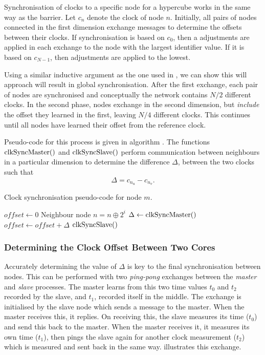 Synchronisation of clocks to a specific node for a hypercube works in the same
way as the barrier. Let $c_n$ denote the clock of node $n$. Initially, all pairs
of nodes connected in the first dimension exchange messages to determine the
offsets between their clocks. If synchronisation is based on $c_0$, then a
adjustments are applied in each exchange to the node with the largest identifier
value. If it is based on $c_{N-1}$, then adjustments are applied to the lowest. 

Using a similar inductive argument as the one used in , we can
show this will approach will result in global synchronisation. After the 
first exchange, each pair of nodes are synchronised and conceptually the network
contains $N/2$ different clocks. In the second phase, nodes exchange in the
second dimension, but \emph{include} the offset they learned in the first,
leaving $N/4$ different clocks. This continues until all nodes have learned their
offset from the reference clock. 

Pseudo-code for this process is given in algorithm .  The
functions $\mathop{\mathrm{clkSyncMaster}()}$ and $\mathop{\mathrm{clkSyncSlave}()}$ perform communication between
neighbours in a particular dimension to determine the difference $\Delta$,
between the two clocks such that $$\Delta = c_{n_u} - c_{n_v}.$$

\begin{algorithm}
\caption{Clock synchronisation pseudo-code for node $m$.}
\label{alg:clksync}

\begin{algorithmic}
\STATE $offset \gets 0$
    \STATE Neighbour node $n = n \oplus 2^i$
        \STATE $\Delta \gets \mathop{\mathrm{clkSyncMaster}()}$
        \STATE $offset \gets offset + \Delta$
    \ELSE
        \STATE $\mathop{\mathrm{clkSyncSlave}()}$
    \ENDIF
\ENDFOR
\end{algorithmic}
\end{algorithm}

\subsubsection{Determining the Clock Offset Between Two Cores}

Accurately determining the value of $\Delta$ is key to the final synchronisation
between nodes.  This can be performed with two \emph{ping-pong} exchanges
between the \emph{master} and \emph{slave} processes. The master learns from
this two time values $t_0$ and $t_2$ recorded by the slave, and $t_1$, recorded
itself in the middle. The exchange is initialised by the slave node which sends
a message to the master.  When the master receives this, it replies. On
receiving this, the slave measures its time ($t_0$) and send this back to the
master. When the master receives it, it measures its own time ($t_1$), then
pings the slave again for another clock measurement ($t_2$) which is measured
and sent back in the same way.  illustrates this exchange. 

